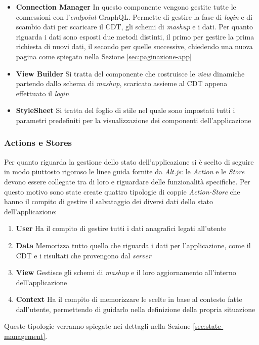 \begin{itemize}
	\item \textbf{Connection Manager}
	In questo componente vengono gestite tutte le connessioni con l'\emph{endpoint} GraphQL. Permette di gestire la fase di \emph{login} e di scambio dati per scaricare il CDT, gli schemi di \emph{mashup} e i dati. Per quanto riguarda i dati sono esposti due metodi distinti, il primo per gestire la prima richiesta di nuovi dati, il secondo per quelle successive, chiedendo una nuova pagina come spiegato nella Sezione \ref{sec:paginazione-app}
	\item \textbf{View Builder}
	Si tratta del componente che costruisce le \emph{view} dinamiche partendo dallo schema di \emph{mashup}, scaricato assieme al CDT appena effettuato il \emph{login}	
	\item \textbf{StyleSheet}
	Si tratta del foglio di stile nel quale sono impostati tutti i parametri predefiniti per la visualizzazione dei componenti dell'applicazione
\end{itemize}

\subsubsection{Actions e Stores}
Per quanto riguarda la gestione dello stato dell'applicazione si è scelto di seguire in modo piuttosto rigoroso le linee guida fornite da \emph{Alt.js}: le \emph{Action} e le \emph{Store} devono essere collegate tra di loro e riguardare delle funzionalità specifiche.
Per questo motivo sono state create quattro tipologie di coppie \emph{Action-Store} che hanno il compito di gestire il salvataggio dei diversi dati dello stato dell'applicazione: 
\begin{enumerate}
	\item \textbf{User} Ha il compito di gestire tutti i dati anagrafici legati all'utente
	\item \textbf{Data} Memorizza tutto quello che riguarda i dati per l'applicazione, come il CDT e i risultati che provengono dal \emph{server}
	\item \textbf{View} Gestisce gli schemi di \emph{mashup} e il loro aggiornamento all'interno dell'applicazione
	\item \textbf{Context} Ha il compito di memorizzare le scelte in base al contesto fatte dall'utente, permettendo di guidarlo nella definizione della propria situazione
\end{enumerate}

Queste tipologie verranno spiegate nei dettagli nella Sezione \ref{sec:state-management}.

